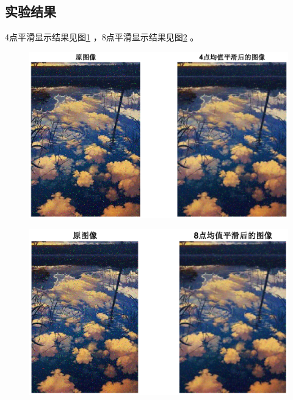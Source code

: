 \documentclass[12pt]{article}
\begin{document}
\subsection{实验结果}
4点平滑显示结果见图\ref{4p}
，8点平滑显示结果见图\ref{8p}
。
\begin{figure}[htbp]
  \centering
  \includegraphics[width=\textwidth]{picture/4points}
  \caption{}\label{4p}
\end{figure}
\begin{figure}[htbp]
  \centering
  \includegraphics[width=\textwidth]{picture/8points}
  \caption{}\label{8p}
\end{figure}
\appendix
{}
\end{document}
